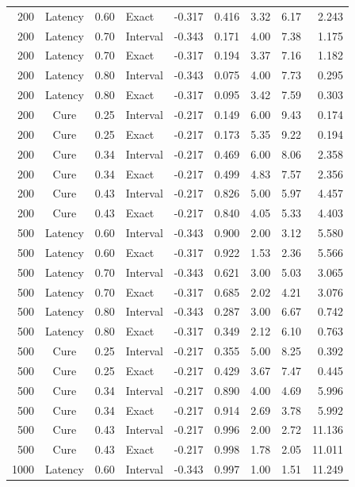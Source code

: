\documentclass[12pt]{article}
\theoremstyle{definition}
\theoremstyle{remark}
\begin{document}
\begin{longtable}{rcrlrrrrr}
200 & Latency & 0.60 & Exact & -0.317 & 0.416 & 3.32 & 6.17 & 2.243 \\
200 & Latency & 0.70 & Interval & -0.343 & 0.171 & 4.00 & 7.38 & 1.175 \\
200 & Latency & 0.70 & Exact & -0.317 & 0.194 & 3.37 & 7.16 & 1.182 \\
200 & Latency & 0.80 & Interval & -0.343 & 0.075 & 4.00 & 7.73 & 0.295 \\
200 & Latency & 0.80 & Exact & -0.317 & 0.095 & 3.42 & 7.59 & 0.303 \\
200 & Cure & 0.25 & Interval & -0.217 & 0.149 & 6.00 & 9.43 & 0.174 \\
200 & Cure & 0.25 & Exact & -0.217 & 0.173 & 5.35 & 9.22 & 0.194 \\
200 & Cure & 0.34 & Interval & -0.217 & 0.469 & 6.00 & 8.06 & 2.358 \\
200 & Cure & 0.34 & Exact & -0.217 & 0.499 & 4.83 & 7.57 & 2.356 \\
200 & Cure & 0.43 & Interval & -0.217 & 0.826 & 5.00 & 5.97 & 4.457 \\
200 & Cure & 0.43 & Exact & -0.217 & 0.840 & 4.05 & 5.33 & 4.403 \\
500 & Latency & 0.60 & Interval & -0.343 & 0.900 & 2.00 & 3.12 & 5.580 \\
500 & Latency & 0.60 & Exact & -0.317 & 0.922 & 1.53 & 2.36 & 5.566 \\
500 & Latency & 0.70 & Interval & -0.343 & 0.621 & 3.00 & 5.03 & 3.065 \\
500 & Latency & 0.70 & Exact & -0.317 & 0.685 & 2.02 & 4.21 & 3.076 \\
500 & Latency & 0.80 & Interval & -0.343 & 0.287 & 3.00 & 6.67 & 0.742 \\
500 & Latency & 0.80 & Exact & -0.317 & 0.349 & 2.12 & 6.10 & 0.763 \\
500 & Cure & 0.25 & Interval & -0.217 & 0.355 & 5.00 & 8.25 & 0.392 \\
500 & Cure & 0.25 & Exact & -0.217 & 0.429 & 3.67 & 7.47 & 0.445 \\
500 & Cure & 0.34 & Interval & -0.217 & 0.890 & 4.00 & 4.69 & 5.996 \\
500 & Cure & 0.34 & Exact & -0.217 & 0.914 & 2.69 & 3.78 & 5.992 \\
500 & Cure & 0.43 & Interval & -0.217 & 0.996 & 2.00 & 2.72 & 11.136 \\
500 & Cure & 0.43 & Exact & -0.217 & 0.998 & 1.78 & 2.05 & 11.011 \\
1000 & Latency & 0.60 & Interval & -0.343 & 0.997 & 1.00 & 1.51 & 11.249 \\

\end{longtable}
\end{document}
